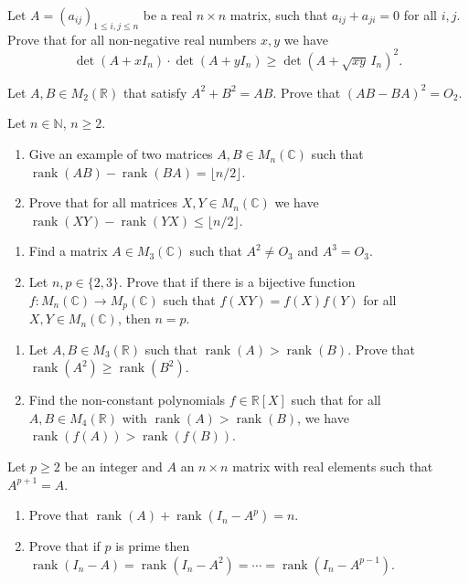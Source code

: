 \documentclass[12pt]{article}
\begin{document}
\begin{problems}
\item Let $A=(a_{ij})_{1\le i,j\le n}$ be a real $n\times n$ matrix, such that $a_{ij}+a_{ji}=0$ for all $i,j$. Prove that for all non-negative real numbers $x,y$ we have
\[
\det(A+xI_n)\cdot\det(A+yI_n) \ge \det(A+\sqrt{xy}\,I_n)^2.
\]

\item Let $A,B\in M_2(\mathbb{R})$ that satisfy $A^2+B^2=AB$. Prove that $(AB-BA)^2 = O_2$.

\item Let $n\in\mathbb{N}$, $n\ge 2$.
\begin{enumerate}[label=(\alph*)]
\item Give an example of two matrices $A,B\in M_n(\mathbb{C})$ such that $\operatorname{rank}(AB)-\operatorname{rank}(BA) = \lfloor n/2\rfloor$.
\item Prove that for all matrices $X,Y\in M_n(\mathbb{C})$ we have $\operatorname{rank}(XY) - \operatorname{rank}(YX) \le \lfloor n/2\rfloor$.
\end{enumerate}

\item
\begin{enumerate}[label=(\alph*)]
\item Find a matrix $A\in M_3(\mathbb{C})$ such that $A^2\ne O_3$ and $A^3=O_3$.
\item Let $n,p\in\{2,3\}$. Prove that if there is a bijective function $f:M_n(\mathbb{C})\to M_p(\mathbb{C})$ such that $f(XY)=f(X)f(Y)$ for all $X,Y\in M_n(\mathbb{C})$, then $n=p$.
\end{enumerate}

\item
\begin{enumerate}[label=(\alph*)]
\item Let $A,B\in M_3(\mathbb{R})$ such that $\operatorname{rank}(A) > \operatorname{rank}(B)$. Prove that $\operatorname{rank}(A^2) \ge \operatorname{rank}(B^2)$.
\item Find the non-constant polynomials $f\in\mathbb{R}[X]$ such that for all $A,B\in M_4(\mathbb{R})$ with $\operatorname{rank}(A)>\operatorname{rank}(B)$, we have $\operatorname{rank}(f(A)) > \operatorname{rank}(f(B))$.
\end{enumerate}

\item Let $p\ge 2$ be an integer and $A$ an $n\times n$ matrix with real elements such that $A^{p+1}=A$.
\begin{enumerate}[label=(\alph*)]
\item Prove that $\operatorname{rank}(A) + \operatorname{rank}(I_n-A^p) = n$.
\item Prove that if $p$ is prime then $\operatorname{rank}(I_n-A) = \operatorname{rank}(I_n-A^2) = \cdots = \operatorname{rank}(I_n-A^{p-1})$.
\end{enumerate}


\end{problems}
\end{document}
